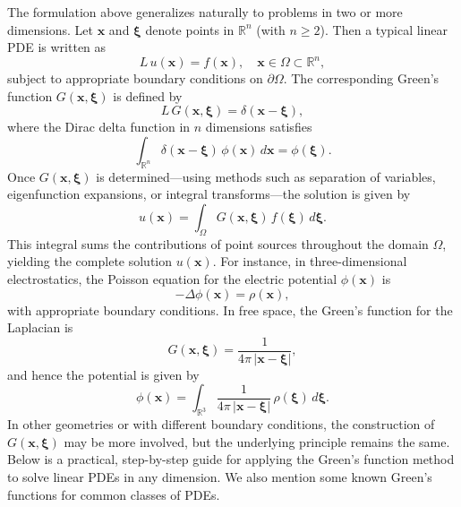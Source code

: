 \noindent
The formulation above generalizes naturally to problems in two or more dimensions. Let \(\mathbf{x}\) and \(\boldsymbol{\xi}\) denote points in \(\mathbb{R}^n\) (with \(n\geq2\)). Then a typical linear PDE is written as
\[
L\,u(\mathbf{x})=f(\mathbf{x}),\quad \mathbf{x}\in\Omega\subset\mathbb{R}^n,
\]
subject to appropriate boundary conditions on \(\partial\Omega\). The corresponding Green's function \(G(\mathbf{x},\boldsymbol{\xi})\) is defined by
\[
L\,G(\mathbf{x},\boldsymbol{\xi})=\delta(\mathbf{x}-\boldsymbol{\xi}),
\]
where the Dirac delta function in \(n\) dimensions satisfies
\[
\int_{\mathbb{R}^n}\delta(\mathbf{x}-\boldsymbol{\xi})\,\phi(\mathbf{x})\,d\mathbf{x} = \phi(\boldsymbol{\xi}).
\]
Once \(G(\mathbf{x},\boldsymbol{\xi})\) is determined—using methods such as separation of variables, eigenfunction expansions, or integral transforms—the solution is given by
\[
u(\mathbf{x}) = \int_{\Omega} G(\mathbf{x},\boldsymbol{\xi})\,f(\boldsymbol{\xi})\,d\boldsymbol{\xi}.
\]
This integral sums the contributions of point sources throughout the domain \(\Omega\), yielding the complete solution \(u(\mathbf{x})\). For instance, in three-dimensional electrostatics, the Poisson equation for the electric potential \(\phi(\mathbf{x})\) is
\[
-\Delta \phi(\mathbf{x})= \rho(\mathbf{x}),
\]
with appropriate boundary conditions. In free space, the Green's function for the Laplacian is
\[
G(\mathbf{x},\boldsymbol{\xi}) = \frac{1}{4\pi\,|\mathbf{x}-\boldsymbol{\xi}|},
\]
and hence the potential is given by
\[
\phi(\mathbf{x}) = \int_{\mathbb{R}^3} \frac{1}{4\pi\,|\mathbf{x}-\boldsymbol{\xi}|}\,\rho(\boldsymbol{\xi})\,d\boldsymbol{\xi}.
\]
In other geometries or with different boundary conditions, the construction of \(G(\mathbf{x},\boldsymbol{\xi})\) may be more involved, but the underlying principle remains the same. \\

\noindent Below is a practical, step-by-step guide for applying the Green's function method to solve linear PDEs in any dimension. We also mention some known Green's functions for common classes of PDEs.

